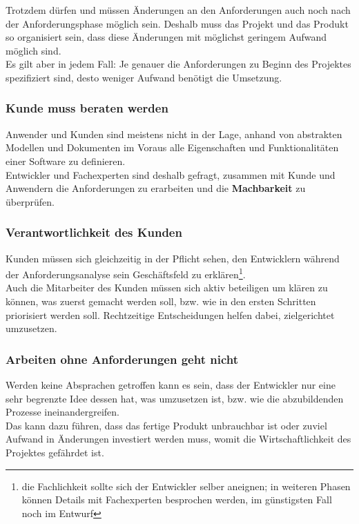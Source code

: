 \noindent
Trotzdem dürfen und müssen Änderungen an den Anforderungen auch noch nach der Anforderungsphase möglich sein.
Deshalb muss das Projekt und das Produkt so organisiert sein, dass diese Änderungen mit möglichst geringem Aufwand möglich sind.\\
Es gilt aber in jedem Fall: Je genauer die Anforderungen zu Beginn des Projektes spezifiziert sind, desto weniger Aufwand benötigt die Umsetzung.\\


\subsubsection*{Kunde muss beraten werden}
Anwender und Kunden sind meistens nicht in der Lage, anhand von abstrakten Modellen und Dokumenten im Voraus alle Eigenschaften und Funktionalitäten einer Software zu definieren.\\
Entwickler und Fachexperten sind deshalb gefragt, zusammen mit Kunde und Anwendern die Anforderungen zu erarbeiten und die \textbf{Machbarkeit} zu überprüfen.\\


\subsubsection*{Verantwortlichkeit des Kunden}
Kunden müssen sich gleichzeitig in der Pflicht sehen, den Entwicklern während der Anforderungsanalyse sein Geschäftsfeld zu erklären\footnote{
die Fachlichkeit sollte sich der Entwickler selber aneignen; in weiteren Phasen können Details mit Fachexperten besprochen werden, im günstigsten Fall noch im Entwurf
}.\\
Auch die Mitarbeiter des Kunden müssen sich aktiv beteiligen um klären zu können, was zuerst gemacht werden soll, bzw. wie in den ersten Schritten priorisiert werden soll.
Rechtzeitige Entscheidungen helfen dabei, zielgerichtet umzusetzen.\\


\subsubsection*{Arbeiten ohne Anforderungen geht nicht}
Werden keine Absprachen getroffen kann es sein, dass der Entwickler nur eine sehr begrenzte Idee dessen hat, was umzusetzen ist, bzw. wie die abzubildenden Prozesse ineinandergreifen.\\
Das kann dazu führen, dass das fertige Produkt unbrauchbar ist oder zuviel Aufwand in Änderungen investiert werden muss, womit die Wirtschaftlichkeit des Projektes gefährdet ist.\\

